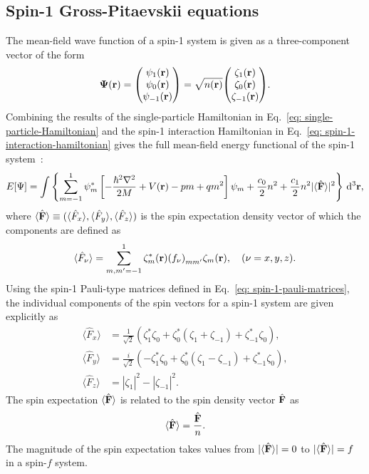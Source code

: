 \subsection{Spin-1 Gross-Pitaevskii equations}\label{subsec: spin-1-gpes}
The mean-field wave function of a spin-1 system is given as a three-component
vector of the form
\begin{align}
    \vb{\Psi}(\vb{r}) = \mqty(\psi_1(\vb{r}) \\ \psi_0(\vb{r}) \\
    \psi_{-1}(\vb{r})) = \sqrt{n(\vb{r})}\mqty(\zeta_1(\vb{r}) \\
    \zeta_{0}(\vb{r}) \\ \zeta_{-1}(\vb{r})).
\end{align}
Combining the results of the single-particle Hamiltonian in
Eq.~\eqref{eq: single-particle-Hamiltonian} and the spin-1 interaction
Hamiltonian in Eq.~\eqref{eq: spin-1-interaction-hamiltonian} gives the
full mean-field energy functional of the spin-1 system~\cite{Kawaguchi2012}:
\begin{align}\label{eq: spin-1-energy-functional}
    E[\Psi] = \int \left\{\sum_{m=-1}^1\psi_m^*\left[-\frac{\hbar^2\nabla^2}{2M}
    + V(\vb{r}) - pm + qm^2\right]\psi_m
    + \frac{c_0}{2}n^2 + \frac{c_1}{2}n^2|\langle \hat{\vb{F}} \rangle |^2 \right\} \, \dd^3\vb{r},
\end{align}
where \(\langle\hat{\vb{F}}\rangle\equiv(\langle\hat{F}_x\rangle,
\langle\hat{F}_y\rangle, \langle\hat{F}_z\rangle)\) is the spin expectation
density vector of which the components are defined as
\begin{align}\label{eq: spin-vector-components}
    \langle\hat{F}_\nu\rangle = \sum_{m,m'=-1}^1\zeta^*_m(\vb{r}){(f_\nu)}_{mm'}
        \zeta_m(\vb{r}), \quad (\nu = x, y, z).
\end{align}
Using the spin-1 Pauli-type matrices defined in
Eq.~\eqref{eq: spin-1-pauli-matrices}, the individual components of the spin
vectors for a spin-1 system are given explicitly as
\begin{align}\label{eq: spin-1-spin-vectors}
    \langle\hat{F}_x\rangle &= \frac{1}{\sqrt{2}} \left(\zeta_1^*\zeta_0
    + \zeta_0^*(\zeta_1+\zeta_{-1}) + \zeta_{-1}^*\zeta_0\right), \\
    \langle\hat{F}_y\rangle &= \frac{i}{\sqrt{2}}\left(-\zeta_1^*\zeta_0
    + \zeta_0^*(\zeta_1-\zeta_{-1}) +\zeta_{-1}^*\zeta_0\right), \\
    \langle\hat{F}_z\rangle &= |\zeta_1|^2-|\zeta_{-1}|^2.
\end{align}
The spin expectation \(\langle\hat{\vb{F}}\rangle\) is related to the spin
density vector \(\hat{\vb{F}}\) as
\begin{align}
    \langle\hat{\vb{F}}\rangle = \frac{\hat{\vb{F}}}{n}.
\end{align}
The magnitude of the spin expectation takes values from \(|\langle \hat{\vb{F}} \rangle |=0\) to
\(|\langle \hat{\vb{F}} \rangle |=f\) in a spin-\(f\) system.


